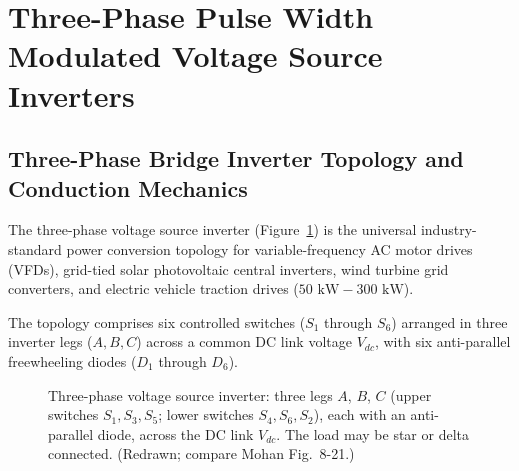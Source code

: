 \documentclass[11pt,a4paper]{article}
\newcommand{\swleg}[4]{%
  \draw[thick] (#1,#2+0.75)--(#1,#2+0.35) (#1,#2-0.35)--(#1,#2-0.75);
  \draw[thick,fill=white] (#1-0.3,#2-0.35) rectangle (#1+0.3,#2+0.35);
  \node[font=\footnotesize] at (#1,#2) {#3};
  \draw[thick] (#1,#2+0.55)--(#1+0.75,#2+0.55)--(#1+0.75,#2+0.2) (#1+0.75,#2-0.2)--(#1+0.75,#2-0.55)--(#1,#2-0.55);
  \draw[thick,fill=black] (#1+0.63,#2-0.2)--(#1+0.87,#2-0.2)--(#1+0.75,#2+0.2)--cycle;
  \draw[thick] (#1+0.63,#2+0.2)--(#1+0.87,#2+0.2);
  \node[font=\scriptsize,right] at (#1+0.88,#2) {#4};
}
\newcommand{\cellplate}[2]{\fill[white] (#1-0.3,#2-0.2) rectangle (#1+0.3,#2+0.2);\draw[thick] (#1-0.3,#2+0.1)--(#1+0.3,#2+0.1) (#1-0.16,#2-0.1)--(#1+0.16,#2-0.1);}
\let\origsection\section
\renewcommand{\section}{\Needspace{12\baselineskip}\origsection}
\let\origsubsection\subsection
\renewcommand{\subsection}{\Needspace{7\baselineskip}\origsubsection}
\begin{document}
\section{Three-Phase Pulse Width Modulated Voltage Source Inverters}

\subsection{Three-Phase Bridge Inverter Topology and Conduction Mechanics}

The three-phase voltage source inverter (Figure~\ref{fig:3ph_inverter_ckt}) is the universal industry-standard power conversion topology for variable-frequency AC motor drives (VFDs), grid-tied solar photovoltaic central inverters, wind turbine grid converters, and electric vehicle traction drives ($50\text{ kW} - 300\text{ kW}$).

The topology comprises six controlled switches ($S_1$ through $S_6$) arranged in three inverter legs ($A, B, C$) across a common DC link voltage $V_{dc}$, with six anti-parallel freewheeling diodes ($D_1$ through $D_6$).

\begin{figure}[htbp]
\centering
{}
\caption{Three-phase voltage source inverter: three legs $A$, $B$, $C$ (upper switches $S_1, S_3, S_5$; lower switches $S_4, S_6, S_2$), each with an anti-parallel diode, across the DC link $V_{dc}$. The load may be star or delta connected. (Redrawn; compare Mohan Fig.~8-21.)}
\label{fig:3ph_inverter_ckt}
\end{figure}
\end{document}
